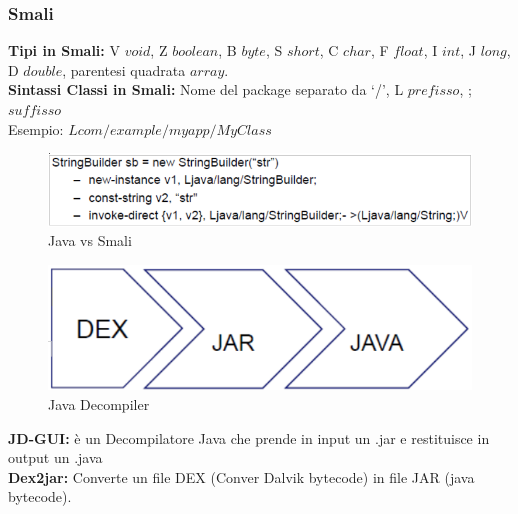 \documentclass[8pt]{extarticle}
\begin{document}
\subsubsection{Smali}
\noindent
\textbf{Tipi in Smali:} V \(void\), Z \(boolean\), B \(byte\), S \(short\), C \(char\), F \(float\), 
I \(int\), J \(long\), D \(double\), parentesi quadrata \(array\).\\
\textbf{Sintassi Classi in Smali:} Nome del package separato da ‘/’, L \(prefisso\), ; \(suffisso\)\\
Esempio: \(Lcom/example/myapp/MyClass\)
\begin{figure}[H]
    \center
    \includegraphics[scale=0.4]{images/RCE5.png}
    \caption{Java vs Smali}\label{fig:1}
\end{figure}
\begin{figure}[H]
    \center
    \includegraphics[scale=0.3]{images/RCE6.png}
    \caption{Java Decompiler}\label{fig:1}
\end{figure}
\noindent
\textbf{JD-GUI:} è un Decompilatore Java che prende in input un .jar e restituisce in output un .java\\
\textbf{Dex2jar:} Converte un file DEX (Conver Dalvik bytecode) in file JAR (java bytecode).
\end{document}

